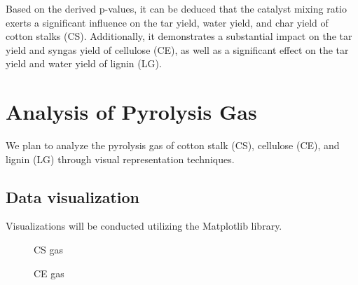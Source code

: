 \documentclass{swmcmthesis}
\begin{document}
Based on the derived p-values, it can be deduced that the catalyst mixing ratio exerts a significant influence on the tar yield, water yield, and char yield of cotton stalks (CS). Additionally, it demonstrates a substantial impact on the tar yield and syngas yield of cellulose (CE), as well as a significant effect on the tar yield and water yield of lignin (LG).

\section{Analysis of Pyrolysis Gas}

We plan to analyze the pyrolysis gas of cotton stalk (CS), cellulose (CE), and lignin (LG) through visual representation techniques.

\subsection{Data visualization}

Visualizations will be conducted utilizing the Matplotlib library.

\begin{figure}[h!t]
    \centering
    \hfill
    \caption{CS gas}
\end{figure}

\begin{figure}[h!t]
    \centering
    \hfill
    \caption{CE gas}
\end{figure}
\end{document}
